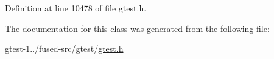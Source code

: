 \-Definition at line 10478 of file gtest.\-h.



\-The documentation for this class was generated from the following file\-:\begin{DoxyCompactItemize}
\item 
gtest-\/1../fused-\/src/gtest/\hyperlink{fused-src_2gtest_2gtest_8h}{gtest.\-h}\end{DoxyCompactItemize}
